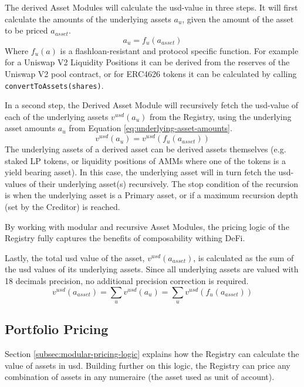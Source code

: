\documentclass[sigconf,nonacm]{acmart}
\begin{document}
The derived Asset Modules will calculate the usd-value in three steps.
It will first calculate the amounts of the underlying assets $a_{u}$, given the amount of the asset to be priced $a_{asset}$.
\begin{equation}
    \label{eq:underlying-asset-amounts}
    a_{u} = f_{u}(a_{asset})
\end{equation}
Where $f_{u}(a)$ is a flashloan-resistant and protocol specific function.
For example for a Uniswap V2 Liquidity Positions it can be derived from the reserves of the Uniswap V2 pool contract,
or for ERC4626 tokens it can be calculated by calling \texttt{convertToAssets(shares)}.

In a second step, the Derived Asset Module will recursively fetch the usd-value of each of the underlying assets $v^{usd}(a_{u})$ from the Registry,
using the underlying asset amounts $a_{u}$ from Equation \ref{eq:underlying-asset-amounts}.
\begin{equation}
    v^{usd}(a_{u}) = v^{usd}(f_{u}(a_{asset}))
\end{equation}
The underlying assets of a derived asset can be derived assets themselves (e.g. staked LP tokens, or liquidity positions of AMMs where one of the tokens is a yield bearing asset).
In this case, the underlying asset will in turn fetch the usd-values of their underlying asset(s) recursively.
The stop condition of the recursion is when the underlying asset is a Primary asset, or if a maximum recursion depth (set by the Creditor) is reached.

By working with modular and recursive Asset Modules, the pricing logic of the Registry fully captures the benefits of composability withing DeFi.

Lastly, the total usd value of the asset, $v^{usd}(a_{asset})$, is calculated as the sum of the usd values of its underlying assets.
Since all underlying assets are valued with 18 decimals precision, no additional precision correction is required.
\begin{equation}
    v^{usd}(a_{asset}) = \sum_{u}{v^{usd}(a_{u})} = \sum_{u}{v^{usd}(f_{u}(a_{asset}))}
\end{equation}

\subsection{Portfolio Pricing}
\label{subsec:portfolio-pricing}
Section \ref{subsec:modular-pricing-logic} explains how the Registry can calculate the value of assets in usd.
Building further on this logic, the Registry can price any combination of assets in any numeraire (the asset used as unit of account).
\end{document}
